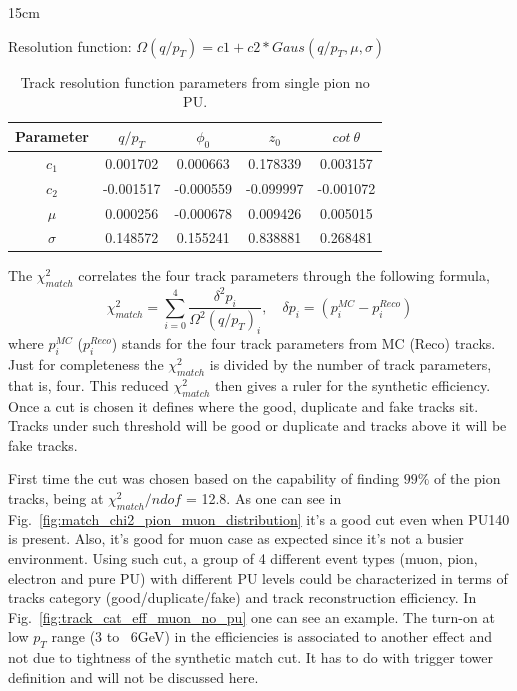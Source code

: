 \begin{table}[htbp]{15cm}
	\caption{Track resolution function parameters from single pion no PU.}
	\centering
	Resolution function: $\Omega(q/p_{T}) = c1 + c2*Gaus(q/p_{T}, \mu, \sigma)$\\
	\begin{tabular}{c|c|c|c|c}
		\hline
		Parameter & $q/p_{T}$ & $\phi_{0}$ & $z_{0}$   & $cot~\theta$\\ 
		\hline
		\hline
		$c_{1}$   & 0.001702  & 0.000663   & 0.178339  & 0.003157\\
		$c_{2}$   & -0.001517 & -0.000559  & -0.099997 & -0.001072\\
		$\mu$     & 0.000256  & -0.000678  & 0.009426  & 0.005015\\
		$\sigma$  & 0.148572  & 0.155241   & 0.838881  & 0.268481\\
		\hline
	\end{tabular}
	\label{tab:resolution_function_parameters}

\end{table}

The $\chi^{2}_{match}$ correlates the four track parameters through the following formula,
\begin{equation}
	\chi^{2}_{match} = \sum_{i=0}^{4} \frac{\delta^{2}p_{i}}{\Omega^{2}(q/p_{T})_{i}}, 
	\quad
	\delta p_{i} = (p_{i}^{MC}-p_{i}^{Reco})
\end{equation}
where $p^{MC}_{i}$ ($p^{Reco}_{i}$) stands for the four track parameters from MC (Reco) tracks. Just for completeness the $\chi^{2}_{match}$ is divided by the number of track parameters, that is, four. This reduced $\chi^{2}_{match}$ then gives a ruler for the synthetic efficiency. Once a cut is chosen it defines where the good, duplicate and fake tracks sit. Tracks under such threshold will be good or duplicate and tracks above it will be fake tracks.

First time the cut was chosen based on the capability of finding $99\%$ of the pion tracks, being at $\chi^{2}_{match}/ndof$ = 12.8. As one can see in Fig.~\ref{fig:match_chi2_pion_muon_distribution} it's a good cut even when PU140 is present. Also, it's good for muon case as expected since it's not a busier environment. Using such cut, a group of 4 different event types (muon, pion, electron and pure PU) with different PU levels could be characterized in terms of tracks category (good/duplicate/fake) and track reconstruction efficiency. In Fig.~\ref{fig:track_cat_eff_muon_no_pu} one can see an example. The turn-on at low $p_{T}$ range (3 to ~6GeV) in the efficiencies is associated to another effect and not due to tightness of the synthetic match cut. It has to do with trigger tower definition and will not be discussed here.

